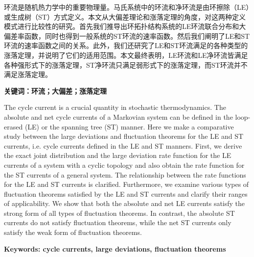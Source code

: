 
\setcounter{page}{1}
\song{}

环流是随机热力学中的重要物理量。马氏系统中的环流和净环流是由环擦除（LE）或生成树（ST）方式定义。本文从大偏差理论和涨落定理的角度，对这两种定义模式进行比较性的研究。首先我们推导出环拓扑结构系统的LE环流联合分布和大偏差率函数，同时也得到一般系统的ST环流的速率函数。然后我们阐明了LE和ST环流的速率函数之间的关系。此外，我们还研究了LE和ST环流满足的各种类型的涨落定理，并说明了它们的适用范围。本文最终表明，LE环流和LE净环流皆满足各种强形式下的涨落定理，ST净环流只满足弱形式下的涨落定理，而ST环流并不满足涨落定理。

\vspace{\baselineskip}

\hangindent=52.3pt\noindent
{\bfseries\xiaosi\song 关键词：环流；大偏差；涨落定理}
\clearpage


The cycle current is a crucial quantity in stochastic thermodynamics. The absolute and net cycle currents of a Markovian system can be defined in the loop-erased (LE) or the spanning tree (ST) manner. Here we make a comparative study between the large deviations and fluctuation theorems for the LE and ST currents, i.e. cycle currents defined in the LE and ST manners. First, we derive the exact joint distribution and the large deviation rate function for the LE currents of a system with a cyclic topology and also obtain the rate function for the ST currents of a general system. The relationship between the rate functions for the LE and ST currents is clarified. Furthermore, we examine various types of fluctuation theorems satisfied by the LE and ST currents and clarify their ranges of applicability. We show that both the absolute and net LE currents satisfy the strong form of all types of fluctuation theorems. In contrast, the absolute ST currents do not satisfy fluctuation theorems, while the net ST currents only satisfy the weak form of fluctuation theorems.

\vspace{\baselineskip}

\hangindent=60pt\noindent
{\textbf{\xiaosi Keywords: cycle currents, large deviations, fluctuation theorems}}
\clearpage
